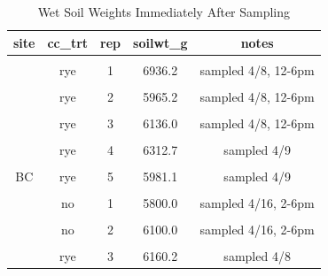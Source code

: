 \documentclass[
]{article}
\begin{document}
\begin{table}[H]

\caption{\label{tab:soilwgtstbl}Wet Soil Weights Immediately After Sampling}
\centering
\begin{tabular}[t]{ccccc}
\toprule
site & cc\_trt & rep & soilwt\_g & notes\\
\midrule
\cellcolor{gray!6}{BC} & \cellcolor{gray!6}{no} & \cellcolor{gray!6}{1} & \cellcolor{gray!6}{6718.3} & \cellcolor{gray!6}{sampled 4/8, 12-6pm}\\
 & rye & 1 & 6936.2 & sampled 4/8, 12-6pm\\

\cellcolor{gray!6}{BC} & \cellcolor{gray!6}{no} & \cellcolor{gray!6}{2} & \cellcolor{gray!6}{6838.6} & \cellcolor{gray!6}{sampled 4/8, 12-6pm}\\
 & rye & 2 & 5965.2 & sampled 4/8, 12-6pm\\

\cellcolor{gray!6}{BC} & \cellcolor{gray!6}{no} & \cellcolor{gray!6}{3} & \cellcolor{gray!6}{6260.4} & \cellcolor{gray!6}{sampled 4/8, 12-6pm}\\
 & rye & 3 & 6136.0 & sampled 4/8, 12-6pm\\

\cellcolor{gray!6}{BC} & \cellcolor{gray!6}{no} & \cellcolor{gray!6}{4} & \cellcolor{gray!6}{5554.9} & \cellcolor{gray!6}{sampled 4/9}\\
 & rye & 4 & 6312.7 & sampled 4/9\\

\cellcolor{gray!6}{BC} & \cellcolor{gray!6}{no} & \cellcolor{gray!6}{5} & \cellcolor{gray!6}{5866.2} & \cellcolor{gray!6}{sampled 4/9}\\
\multirow[t]{-10}{*}{\centering\arraybackslash BC} & rye & 5 & 5981.1 & sampled 4/9\\
\cmidrule{1-5}
\cellcolor{gray!6}{Bcsil} & \cellcolor{gray!6}{rye} & \cellcolor{gray!6}{1} & \cellcolor{gray!6}{6340.0} & \cellcolor{gray!6}{sampled 4/16, 2-6pm}\\
 & no & 1 & 5800.0 & sampled 4/16, 2-6pm\\

\cellcolor{gray!6}{Bcsil} & \cellcolor{gray!6}{rye} & \cellcolor{gray!6}{2} & \cellcolor{gray!6}{5990.0} & \cellcolor{gray!6}{sampled 4/16, 2-6pm}\\
 & no & 2 & 6100.0 & sampled 4/16, 2-6pm\\

\cellcolor{gray!6}{Bcsil} & \cellcolor{gray!6}{no} & \cellcolor{gray!6}{3} & \cellcolor{gray!6}{6245.5} & \cellcolor{gray!6}{sampled 4/8}\\
 & rye & 3 & 6160.2 & sampled 4/8\\


\end{tabular}
\end{table}
\end{document}

